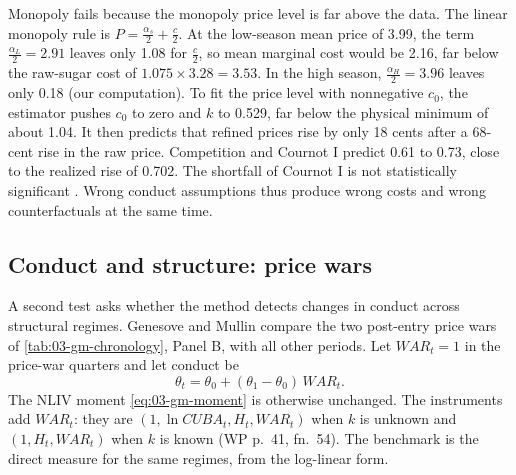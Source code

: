 Monopoly fails because the monopoly price level is far above the data. The linear monopoly rule is
$P = \frac{\alpha_s}{2} + \frac{c}{2}$. At the low-season mean price of 3.99, the term $\frac{\alpha_L}{2} =
2.91$ leaves only 1.08 for $\frac{c}{2}$, so mean marginal cost would be 2.16, far below the raw-sugar cost of
$1.075 \times 3.28 = 3.53$. In the high season, $\frac{\alpha_H}{2} = 3.96$ leaves only 0.18 (our
computation). To fit the price level with nonnegative $c_0$, the estimator pushes $c_0$ to zero and $k$ to
0.529, far below the physical minimum of about 1.04. It then predicts that refined prices rise by only 18 cents after
a 68-cent rise in the raw price. Competition and Cournot I predict 0.61 to 0.73, close to the realized rise
of 0.702. The shortfall of Cournot I is not statistically significant \citep[p.~374]{GenesoveMullin1998}.
Wrong conduct assumptions thus produce wrong costs and wrong counterfactuals at the same time.

\subsection{Conduct and structure: price wars}\label{sec:03-sugar-wars}

A second test asks whether the method detects changes in conduct across structural regimes. Genesove and
Mullin compare the two post-entry price wars of \cref{tab:03-gm-chronology}, Panel B, with all other periods.
Let $\mathit{WAR}_t = 1$ in the price-war quarters and let conduct be
\begin{equation}\label{eq:03-gm-war}
\theta_t = \theta_0 + (\theta_1 - \theta_0)\,\mathit{WAR}_t .
\end{equation}
The NLIV moment \eqref{eq:03-gm-moment} is otherwise unchanged. The instruments add $\mathit{WAR}_t$: they are
$(1, \ln\mathit{CUBA}_t, H_t, \mathit{WAR}_t)$ when $k$ is unknown and $(1, H_t, \mathit{WAR}_t)$ when $k$ is
known (WP p.~41, fn.~54). The benchmark is the direct measure for the same regimes, from the log-linear form.

